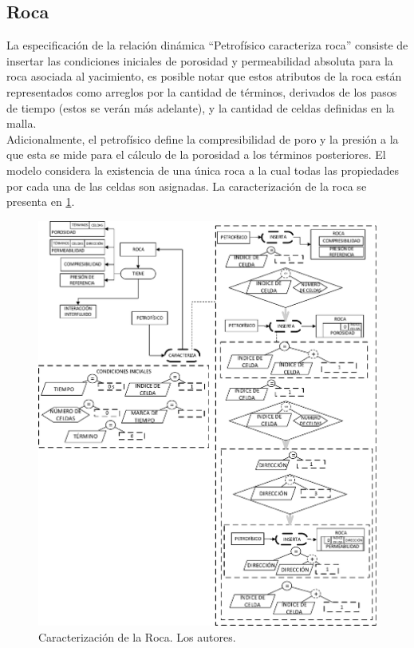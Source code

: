 
\subsection{Roca}\label{sec:PS_Rock}

La especificación de la relación dinámica ``Petrofísico caracteriza roca'' consiste de insertar las condiciones iniciales de porosidad y permeabilidad absoluta para la roca asociada al yacimiento, es posible notar que estos atributos de la roca están representados como arreglos por la cantidad de términos, derivados de los pasos de tiempo (estos se verán más adelante), y la cantidad de celdas definidas en la malla. \\
Adicionalmente, el petrofísico define la compresibilidad de poro y la presión a la que esta se mide para el cálculo de la porosidad a los términos posteriores. El modelo considera la existencia de una única roca a la cual todas las propiedades por cada una de las celdas son asignadas. La caracterización de la roca se presenta en \ref{fig:Rock}.\\

\begin{figure}[h]
	\centering%
	\includegraphics[width=0.90\linewidth]{Fig/Rock.pdf}%
	\caption[Caracterización de la Roca.]{Caracterización de la Roca. Los autores.} \label{fig:Rock}
\end{figure}

